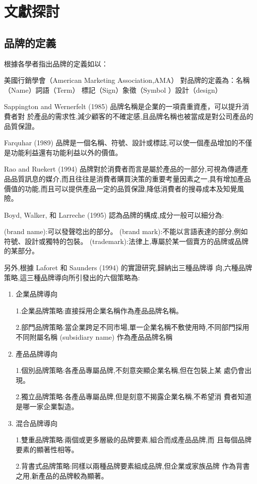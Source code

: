 \chapter{文獻探討}


\section{品牌的定義}

根據各學者指出品牌的定義如以：

美國行銷學會（American Marketing Association,AMA）
對品牌的定義為：名稱 （Name）詞語（Term） 標記（Sign）象徵（Symbol ）設計（design）\cite{AMA}

Sappington and Wernerfelt (1985) \cite{Sappington}品牌名稱是企業的一項貴重資產，可以提升消費者對
於產品的需求性,減少顧客的不確定感,且品牌名稱也被當成是對公司產品的品質保證。

Farquhar (1989) \cite{Farquhar}品牌是一個名稱、符號、設計或標誌,可以使一個產品增加的不僅是功能利益還有功能利益以外的價值。

Rao and Ruekert (1994) \cite{Rao}品牌對於消費者而言是屬於產品的一部分,可視為傳遞產品品質訊息的媒介,而且往往是消費者購買決策的重要考量因素之一,具有增加產品價值的功能,而且可以提供產品一定的品質保證,降低消費者的搜尋成本及知覺風險。

Boyd, Walker, 和 Larreche (1995)\cite{Boyd} 認為品牌的構成,成分一般可以細分為:
\begin{enumerate}
(brand name):可以發聲唸出的部分。
(brand mark):不能以言語表達的部分,例如符號、設計或獨特的包裝。 
(trademark):法律上,專屬於某一個賣方的品牌或品牌的某部分。
\end{enumerate}

另外,根據 Laforet 和 Saunders (1994) 的實證研究,歸納出三種品牌導 向,六種品牌策略,這三種品牌導向所引發出的六個策略為:
\begin{enumerate}
\item 企業品牌導向

1.企業品牌策略:直接採用企業名稱作為產品品牌名稱。 

2.部門品牌策略:當企業跨足不同市場,單一企業名稱不敷使用時,不同部門採用不同附屬名稱 (subsidiary name) 作為產品品牌名稱
\item 產品品牌導向

1.個別品牌策略:各產品專屬品牌,不刻意突顯企業名稱,但在包裝上某 處仍會出現。

2.獨立品牌策略:各產品專屬品牌,但是刻意不揭露企業名稱,不希望消 費者知道是哪一家企業製造。
\item 混合品牌導向

1.雙重品牌策略:兩個或更多層級的品牌要素,組合而成產品品牌,而 且每個品牌要素的顯著性相等。

2.背書式品牌策略:同樣以兩種品牌要素組成品牌,但企業或家族品牌 作為背書之用,新產品的品牌較為顯著。\cite{Laforet}
\end{enumerate}

